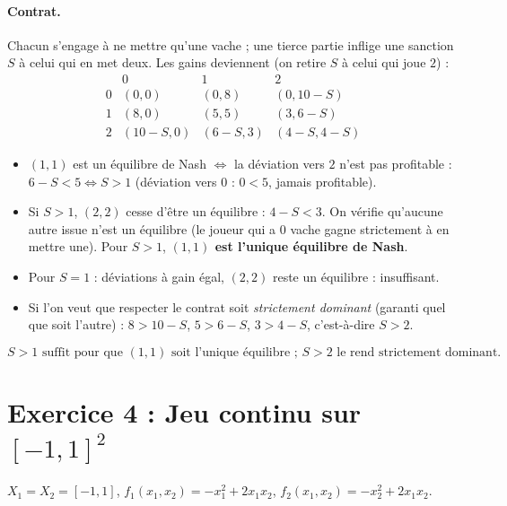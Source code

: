 \documentclass[11pt,a4paper]{article}
\begin{document}
\paragraph{Contrat.} Chacun s'engage à ne mettre qu'une vache ; une tierce partie inflige une sanction $S$ à celui qui en met deux. Les gains deviennent (on retire $S$ à celui qui joue $2$) :
\[
\begin{array}{c|ccc}
 & 0 & 1 & 2\\\hline
0 & (0,0) & (0,8) & (0,10-S)\\
1 & (8,0) & (5,5) & (3,6-S)\\
2 & (10-S,0) & (6-S,3) & (4-S,4-S)
\end{array}
\]
\begin{itemize}
\item $(1,1)$ est un équilibre de Nash $\iff$ la déviation vers $2$ n'est pas profitable : $6-S<5\iff S>1$ (déviation vers $0$ : $0<5$, jamais profitable).
\item Si $S>1$, $(2,2)$ cesse d'être un équilibre : $4-S<3$. On vérifie qu'aucune autre issue n'est un équilibre (le joueur qui a $0$ vache gagne strictement à en mettre une). Pour $S>1$, \textbf{$(1,1)$ est l'unique équilibre de Nash}.
\item Pour $S=1$ : déviations à gain égal, $(2,2)$ reste un équilibre : insuffisant.
\item Si l'on veut que respecter le contrat soit \emph{strictement dominant} (garanti quel que soit l'autre) : $8>10-S$, $5>6-S$, $3>4-S$, c'est-à-dire $S>2$.
\end{itemize}
\[
\boxed{S>1 \text{ suffit pour que } (1,1) \text{ soit l'unique équilibre ; } S>2 \text{ le rend strictement dominant.}}
\]

\section*{Exercice 4 : Jeu continu sur $[-1,1]^2$}
$X_1=X_2=[-1,1]$, $f_1(x_1,x_2)=-x_1^2+2x_1x_2$, $f_2(x_1,x_2)=-x_2^2+2x_1x_2$.
\end{document}
